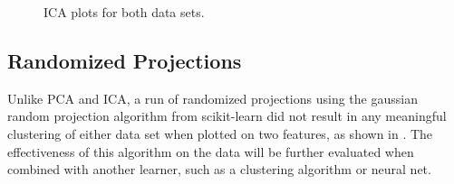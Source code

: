 \documentclass{article}
\begin{document}
\begin{figure}[htb]
      \caption{ICA plots for both data sets.}
      \label{fig:ica-plot}
      \end{figure}

    \subsection{Randomized Projections}
      Unlike PCA and ICA, a run of randomized projections using the gaussian random projection algorithm from scikit-learn did not result in any meaningful clustering of either data set when plotted on two features, as shown in . The effectiveness of this algorithm on the data will be further evaluated when combined with another learner, such as a clustering algorithm or neural net.

      \begin{figure}[htb]
      \centering


\end{figure}
\end{document}

